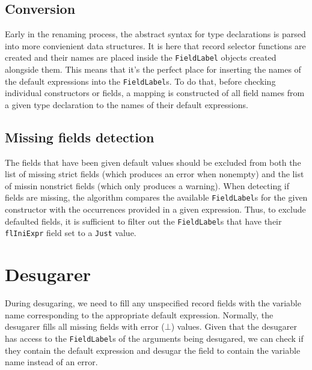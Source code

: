 \documentclass[en]{pracamgr}
\begin{document}
\subsection{Conversion}
Early in the renaming process, the abstract syntax for type declarations is parsed into more convienient data structures.
It is here that record selector functions are created and their names are placed inside the \texttt{FieldLabel} objects created alongside them.
This means that it's the perfect place for inserting the names of the default expressions into the \texttt{FieldLabel}s.
To do that, before checking individual constructors or fields, a mapping is constructed of all field names from a given type declaration to the names of their default expressions.
\subsection{Missing fields detection}
The fields that have been given default values should be excluded from both the list of missing strict fields (which produces an error when nonempty) and the list of missin nonstrict fields (which only produces a warning).
When detecting if fields are missing, the algorithm compares the available \texttt{FieldLabel}s for the given constructor with the occurrences provided in a given expression.
Thus, to exclude defaulted fields, it is sufficient to filter out the \texttt{FieldLabel}s that have their \texttt{flIniExpr} field set to a \texttt{Just} value.

\section{Desugarer}
During desugaring, we need to fill any unspecified record fields with the variable name corresponding to the appropriate default expression.
Normally, the desugarer fills all missing fields with error ($\bot$) values.
Given that the desugarer has access to the \texttt{FieldLabel}s of the arguments being desugared, we can check if they contain the default expression and desugar the field to contain the variable name instead of an error.
\end{document}
